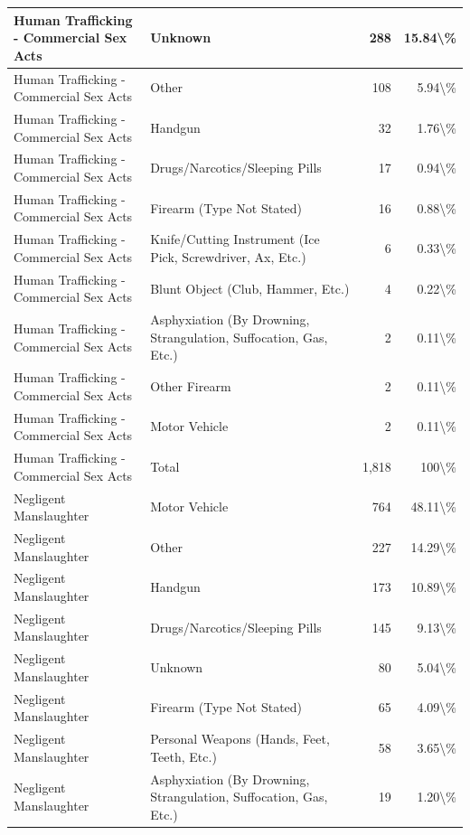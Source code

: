 \documentclass[
]{krantz}
\begin{document}
\begin{longtable}[t]{l|l|r|r}
\hline
Human Trafficking - Commercial Sex Acts & Unknown & 288 & 15.84\textbackslash{}\%\\
\hline
Human Trafficking - Commercial Sex Acts & Other & 108 & 5.94\textbackslash{}\%\\
\hline
Human Trafficking - Commercial Sex Acts & Handgun & 32 & 1.76\textbackslash{}\%\\
\hline
Human Trafficking - Commercial Sex Acts & Drugs/Narcotics/Sleeping Pills & 17 & 0.94\textbackslash{}\%\\
\hline
Human Trafficking - Commercial Sex Acts & Firearm (Type Not Stated) & 16 & 0.88\textbackslash{}\%\\
\hline
Human Trafficking - Commercial Sex Acts & Knife/Cutting Instrument (Ice Pick, Screwdriver, Ax, Etc.) & 6 & 0.33\textbackslash{}\%\\
\hline
Human Trafficking - Commercial Sex Acts & Blunt Object (Club, Hammer, Etc.) & 4 & 0.22\textbackslash{}\%\\
\hline
Human Trafficking - Commercial Sex Acts & Asphyxiation (By Drowning, Strangulation, Suffocation, Gas, Etc.) & 2 & 0.11\textbackslash{}\%\\
\hline
Human Trafficking - Commercial Sex Acts & Other Firearm & 2 & 0.11\textbackslash{}\%\\
\hline
Human Trafficking - Commercial Sex Acts & Motor Vehicle & 2 & 0.11\textbackslash{}\%\\
\hline
Human Trafficking - Commercial Sex Acts & Total & 1,818 & 100\textbackslash{}\%\\
\hline
Negligent Manslaughter & Motor Vehicle & 764 & 48.11\textbackslash{}\%\\
\hline
Negligent Manslaughter & Other & 227 & 14.29\textbackslash{}\%\\
\hline
Negligent Manslaughter & Handgun & 173 & 10.89\textbackslash{}\%\\
\hline
Negligent Manslaughter & Drugs/Narcotics/Sleeping Pills & 145 & 9.13\textbackslash{}\%\\
\hline
Negligent Manslaughter & Unknown & 80 & 5.04\textbackslash{}\%\\
\hline
Negligent Manslaughter & Firearm (Type Not Stated) & 65 & 4.09\textbackslash{}\%\\
\hline
Negligent Manslaughter & Personal Weapons (Hands, Feet, Teeth, Etc.) & 58 & 3.65\textbackslash{}\%\\
\hline
Negligent Manslaughter & Asphyxiation (By Drowning, Strangulation, Suffocation, Gas, Etc.) & 19 & 1.20\textbackslash{}\%\\

\end{longtable}
\end{document}
